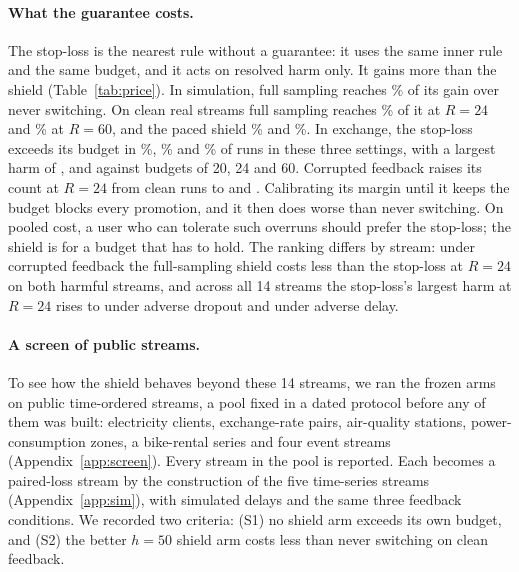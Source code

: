 \documentclass[10pt]{article}
\theoremstyle{plain}
\theoremstyle{definition}
\begin{document}
\paragraph{What the guarantee costs.}
The stop-loss is the nearest rule without a guarantee: it uses the same inner rule and the same budget, and it acts on resolved harm only. It gains more than the shield (Table~\ref{tab:price}). In simulation, full sampling reaches \PriceFullSim\% of its gain over never switching. On clean real streams full sampling reaches \PriceFullTwentyFour\% of it at $R=24$ and \PriceFullSixty\% at $R=60$, and the paced shield \PricePacedTwentyFour\% and \PricePacedSixty\%. In exchange, the stop-loss exceeds its budget in \PriceStopOverSim\%, \PriceStopOverTwentyFour\% and \PriceStopOverSixty\% of runs in these three settings, with a largest harm of \PriceStopMaxSim, \PriceStopMaxTwentyFour{} and \PriceStopMaxSixty{} against budgets of 20, 24 and 60. Corrupted feedback raises its count at $R=24$ from \RealStopExceedClean{} clean runs to \RealStopExceedDropout{} and \RealStopExceedDelay. Calibrating its margin until it keeps the budget blocks every promotion, and it then does worse than never switching. On pooled cost, a user who can tolerate such overruns should prefer the stop-loss; the shield is for a budget that has to hold. The ranking differs by stream: under corrupted feedback the full-sampling shield costs less than the stop-loss at $R=24$ on both harmful streams, and across all 14 streams the stop-loss's largest harm at $R=24$ rises to \PriceStopMaxDropout{} under adverse dropout and \PriceStopMaxDelay{} under adverse delay.
\begin{table}[!htbp]
\caption{What the guarantee costs. ``Gain'' is cost saved against never switching (higher is better), pooled over regimes or streams; ``\% over'' is the share of runs whose harm exceeded the budget; ``max'' is the largest harm in any run. Simulation figures are per run of the registered regimes, real streams per episode with clean feedback. The calibrated stop-loss was run on separate seeds, and on the real streams only at $R=24$ among the budgets shown.}\label{tab:price}
\centering\scriptsize
\resizebox{\linewidth}{!}{}
\end{table}

\paragraph{A screen of \ScreenPool{} public streams.}
To see how the shield behaves beyond these 14 streams, we ran the frozen arms on \ScreenPool{} public time-ordered streams, a pool fixed in a dated protocol before any of them was built: electricity clients, exchange-rate pairs, air-quality stations, power-consumption zones, a bike-rental series and four event streams (Appendix~\ref{app:screen}). Every stream in the pool is reported. Each becomes a paired-loss stream by the construction of the five time-series streams (Appendix~\ref{app:sim}), with simulated delays and the same three feedback conditions. We recorded two criteria: (S1) no shield arm exceeds its own budget, and (S2) the better $h=50$ shield arm costs less than never switching on clean feedback.
\end{document}

